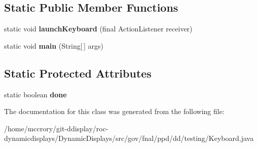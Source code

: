 \subsection*{Static Public Member Functions}
\begin{DoxyCompactItemize}
\item 
\hypertarget{classgov_1_1fnal_1_1ppd_1_1dd_1_1testing_1_1Keyboard_ad18a9c7d9d10895547f73ec00c4e2cbc}{static void {\bfseries launch\-Keyboard} (final Action\-Listener receiver)}\label{classgov_1_1fnal_1_1ppd_1_1dd_1_1testing_1_1Keyboard_ad18a9c7d9d10895547f73ec00c4e2cbc}

\item 
\hypertarget{classgov_1_1fnal_1_1ppd_1_1dd_1_1testing_1_1Keyboard_a9b874638a02ac5f87df622f2b560a367}{static void {\bfseries main} (String\mbox{[}$\,$\mbox{]} args)}\label{classgov_1_1fnal_1_1ppd_1_1dd_1_1testing_1_1Keyboard_a9b874638a02ac5f87df622f2b560a367}

\end{DoxyCompactItemize}
\subsection*{Static Protected Attributes}
\begin{DoxyCompactItemize}
\item 
\hypertarget{classgov_1_1fnal_1_1ppd_1_1dd_1_1testing_1_1Keyboard_abaa375abcfb1ee475b9c2640bbfc7b0c}{static boolean {\bfseries done}}\label{classgov_1_1fnal_1_1ppd_1_1dd_1_1testing_1_1Keyboard_abaa375abcfb1ee475b9c2640bbfc7b0c}

\end{DoxyCompactItemize}


The documentation for this class was generated from the following file\-:\begin{DoxyCompactItemize}
\item 
/home/mccrory/git-\/ddisplay/roc-\/dynamicdisplays/\-Dynamic\-Displays/src/gov/fnal/ppd/dd/testing/Keyboard.\-java\end{DoxyCompactItemize}

